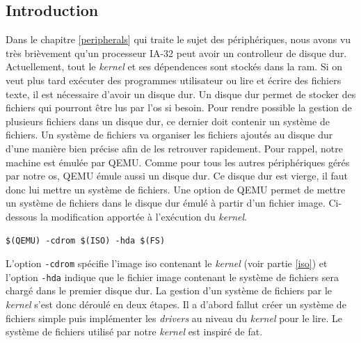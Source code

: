 
\subsection{Introduction}
Dans le chapitre \ref{peripherals} qui traite le sujet des périphériques, nous
avons vu très brièvement qu'un processeur \acrshort{IA-32} peut avoir un controlleur
de disque dur. Actuellement, tout le \textit{kernel} et ses dépendences sont
stockés dans la \acrshort{ram}. Si on veut plus tard exécuter des programmes utilisateur
ou lire et écrire des fichiers texte, il est nécessaire d'avoir un disque dur.
Un disque dur permet de stocker des fichiers qui pourront être lus par l'\acrshort{os}
si besoin. Pour rendre possible la gestion de plusieurs fichiers dans un disque
dur, ce dernier doit contenir un système de fichiers. Un système de fichiers va
organiser les fichiers ajoutés au disque dur d'une manière bien précise afin
de les retrouver rapidement. Pour rappel, notre machine est émulée par QEMU.
Comme pour tous les autres périphériques gérés par notre \acrshort{os}, QEMU
émule aussi un disque dur. Ce disque dur est vierge, il faut donc lui mettre
un système de fichiers. Une option de QEMU permet de mettre un système de fichiers
dans le disque dur émulé à partir d'un fichier image. Ci-dessous la modification
apportée à l'exécution du \textit{kernel}.

\begin{verbatim}
$(QEMU) -cdrom $(ISO) -hda $(FS)
\end{verbatim}

L'option  \texttt{-cdrom} spécifie l'image \acrshort{iso} contenant
le \textit{kernel} (voir partie \ref{iso}) et l'option \texttt{-hda} indique
que le fichier image contenant le système de fichiers sera chargé dans le premier
disque dur. La gestion d'un système de fichiers par le \textit{kernel} s'est donc
déroulé en deux étapes. Il a d'abord fallut créer un système de fichiers simple
puis implémenter les \textit{drivers} au niveau du \textit{kernel} pour le lire.
Le système de fichiers utilisé par notre \textit{kernel} est inspiré de \acrshort{fat}. \\

